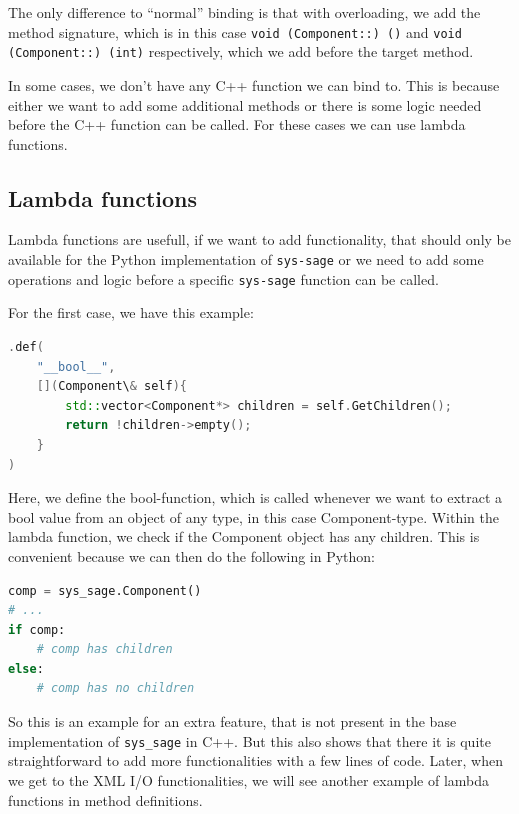 The only difference to “normal” binding is that with overloading, we add the method signature, which is in this case \verb|void (Component::) ()| and \verb|void (Component::) (int)| respectively, which we add before the target method. \cite[see The Basics/Object-Oriented Code]{pybind11-docu}


In some cases, we don't have any C++ function we can bind to. This is because either we want to add some additional methods or there is some logic needed before the C++ function can be called. For these cases we can use lambda functions.

\subsection{Lambda functions}

Lambda functions are usefull, if we want to add functionality, that should only be available for the Python implementation of \texttt{sys-sage} or we need to add some operations and logic before a specific \texttt{sys-sage} function can be called.

For the first case, we have this example:
\newpage
\begin{lstlisting}[language=C++, xleftmargin=4em, frame = single]
.def(
    "__bool__",
    [](Component\& self){
        std::vector<Component*> children = self.GetChildren();
        return !children->empty();
    }
)
\end{lstlisting}

Here, we define the bool-function, which is called whenever we want to extract a bool value from an object of any type, in this case Component-type. Within the lambda function, we check if the Component object has any children. This is convenient because we can then do the following in Python:

\begin{lstlisting}[language=Python,xleftmargin=4em, frame = single]
comp = sys_sage.Component()
# ...
if comp:
    # comp has children
else:
    # comp has no children
\end{lstlisting}

So this is an example for an extra feature, that is not present in the base implementation of \verb|sys_sage| in C++. But this also shows that there it is quite straightforward to add more functionalities with a few lines of code. Later, when we get to the XML I/O functionalities, we will see another example of lambda functions in method definitions.


